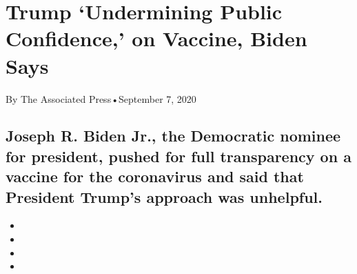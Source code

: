 \hypertarget{trump-undermining-public-confidence-on-vaccine-biden-says-1}{%
\section{Trump `Undermining Public Confidence,' on Vaccine, Biden
Says}\label{trump-undermining-public-confidence-on-vaccine-biden-says-1}}

By The Associated Press•September 7, 2020

\hypertarget{joseph-r-biden-jr-the-democratic-nominee-for-president-pushed-for-full-transparency-on-a-vaccine-for-the-coronavirus-and-said-that-president-trumps-approach-was-unhelpful-1}{%
\subsection{Joseph R. Biden Jr., the Democratic nominee for president,
pushed for full transparency on a vaccine for the coronavirus and said
that President Trump's approach was
unhelpful.}\label{joseph-r-biden-jr-the-democratic-nominee-for-president-pushed-for-full-transparency-on-a-vaccine-for-the-coronavirus-and-said-that-president-trumps-approach-was-unhelpful-1}}

\begin{itemize}
\item
\item
\item
\item
\end{itemize}

